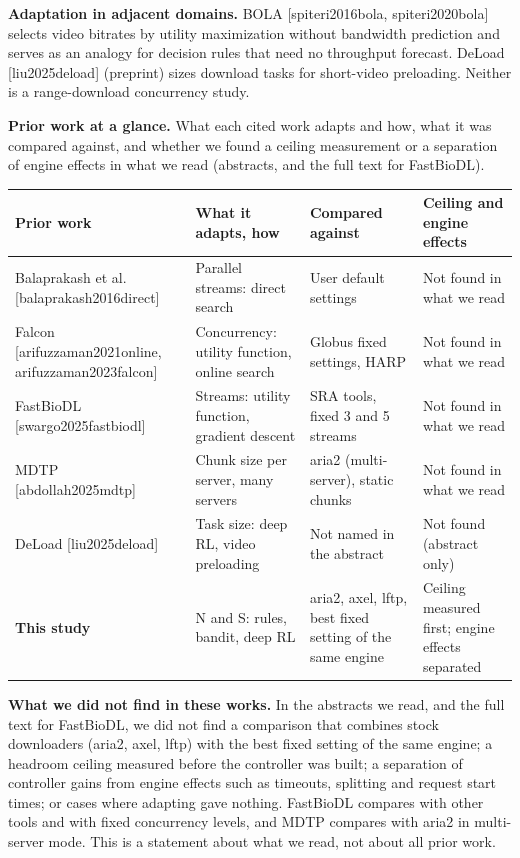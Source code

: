 \documentclass[10pt,a4paper]{article}
\begin{document}
\textbf{Adaptation in adjacent domains.} BOLA [spiteri2016bola, spiteri2020bola] selects video bitrates by utility maximization without bandwidth prediction and serves as an analogy for decision rules that need no throughput forecast. DeLoad [liu2025deload] (preprint) sizes download tasks for short-video preloading. Neither is a range-download concurrency study.


\textbf{Prior work at a glance.} What each cited work adapts and how, what it was compared against, and whether we found a ceiling measurement or a separation of engine effects in what we read (abstracts, and the full text for FastBioDL).


{\small\begin{tabularx}{\linewidth}{@{}LLLL@{}}
\toprule
\textbf{Prior work} & \textbf{What it adapts, how} & \textbf{Compared against} & \textbf{Ceiling and engine effects}\\
\midrule
Balaprakash et al. [balaprakash2016direct] & Parallel streams: direct search & User default settings & Not found in what we read\\
Falcon [arifuzzaman2021online, arifuzzaman2023falcon] & Concurrency: utility function, online search & Globus fixed settings, HARP & Not found in what we read\\
FastBioDL [swargo2025fastbiodl] & Streams: utility function, gradient descent & SRA tools, fixed 3 and 5 streams & Not found in what we read\\
MDTP [abdollah2025mdtp] & Chunk size per server, many servers & aria2 (multi-server), static chunks & Not found in what we read\\
DeLoad [liu2025deload] & Task size: deep RL, video preloading & Not named in the abstract & Not found (abstract only)\\
\textbf{This study} & N and S: rules, bandit, deep RL & aria2, axel, lftp, best fixed setting of the same engine & Ceiling measured first; engine effects separated\\
\bottomrule
\end{tabularx}}


\textbf{What we did not find in these works.} In the abstracts we read, and the full text for FastBioDL, we did not find a comparison that combines stock downloaders (aria2, axel, lftp) with the best fixed setting of the same engine; a headroom ceiling measured before the controller was built; a separation of controller gains from engine effects such as timeouts, splitting and request start times; or cases where adapting gave nothing. FastBioDL compares with other tools and with fixed concurrency levels, and MDTP compares with aria2 in multi-server mode. This is a statement about what we read, not about all prior work.
\end{document}
